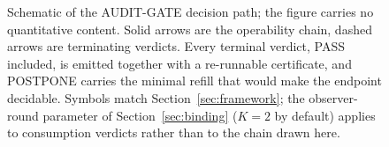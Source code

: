 \documentclass{article}
\begin{document}
\begin{figure}[t]
\caption{Schematic of the AUDIT-GATE decision path; the figure carries no quantitative
content. Solid arrows are the operability chain, dashed arrows are terminating verdicts.
Every terminal verdict, PASS included, is emitted together with a re-runnable
certificate, and POSTPONE carries the minimal refill that would make the endpoint
decidable. Symbols match Section~\ref{sec:framework}; the observer-round parameter of
Section~\ref{sec:binding} ($K=2$ by default) applies to consumption verdicts rather than
to the chain drawn here.}
\label{fig:pipeline}
\end{figure}
\end{document}
